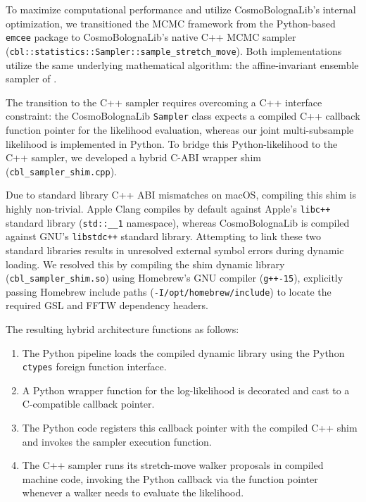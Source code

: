 \documentclass[12pt]{report}
\begin{document}
To maximize computational performance and utilize CosmoBolognaLib's internal optimization, we transitioned the MCMC framework from the Python-based \texttt{emcee} package to CosmoBolognaLib's native C++ MCMC sampler (\texttt{cbl::statistics::Sampler::sample\_stretch\_move}). Both implementations utilize the same underlying mathematical algorithm: the affine-invariant ensemble sampler of \citet{GoodmanWeare2010}.

The transition to the C++ sampler requires overcoming a C++ interface constraint: the CosmoBolognaLib \texttt{Sampler} class expects a compiled C++ callback function pointer for the likelihood evaluation, whereas our joint multi-subsample likelihood is implemented in Python. To bridge this Python-likelihood to the C++ sampler, we developed a hybrid C-ABI wrapper shim (\texttt{cbl\_sampler\_shim.cpp}). 

Due to standard library C++ ABI mismatches on macOS, compiling this shim is highly non-trivial. Apple Clang compiles by default against Apple's \texttt{libc++} standard library (\texttt{std::\_\_1} namespace), whereas CosmoBolognaLib is compiled against GNU's \texttt{libstdc++} standard library. Attempting to link these two standard libraries results in unresolved external symbol errors during dynamic loading. We resolved this by compiling the shim dynamic library (\texttt{cbl\_sampler\_shim.so}) using Homebrew's GNU compiler (\texttt{g++-15}), explicitly passing Homebrew include paths (\texttt{-I/opt/homebrew/include}) to locate the required GSL and FFTW dependency headers.

The resulting hybrid architecture functions as follows:
\begin{enumerate}
    \item The Python pipeline loads the compiled dynamic library using the Python \texttt{ctypes} foreign function interface.
    \item A Python wrapper function for the log-likelihood is decorated and cast to a C-compatible callback pointer.
    \item The Python code registers this callback pointer with the compiled C++ shim and invokes the sampler execution function.
    \item The C++ sampler runs its stretch-move walker proposals in compiled machine code, invoking the Python callback via the function pointer whenever a walker needs to evaluate the likelihood.
\end{enumerate}
\end{document}

